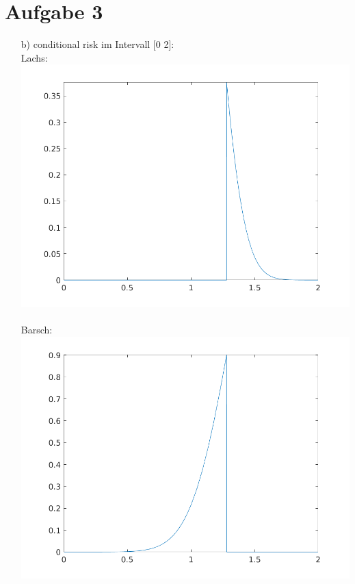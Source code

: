 \documentclass[a4paper]{scrartcl}
\begin{document}
\section*{Aufgabe 3}
\begin{itemize}
	\item[b)] conditional risk im Intervall [0 2]:\\
	Lachs:\\
	\includegraphics*[scale = 0.5]{assignment2_data/plots/cond_risk_salmon.png}\\ \ \\
	Barsch:\\
	\includegraphics*[scale = 0.5]{assignment2_data/plots/cond_risk_seabass.png}
\end{itemize}
\end{document}
